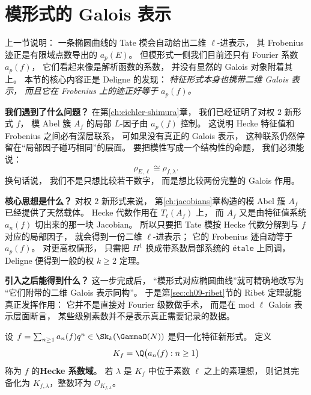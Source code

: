 \section{模形式的 Galois 表示}
\label{sec:ch09-modular-galois}

\providecommand{\Zl}{\mathbb{Z}_\ell}
\providecommand{\Ql}{\mathbb{Q}_\ell}
\providecommand{\rhobar}{\bar{\rho}}

上一节说明：
一条椭圆曲线的 Tate 模会自动给出二维 $\ell$-进表示，
其 Frobenius 迹正是有限域点数导出的 $a_p(E)$。
但模形式一侧我们目前还只有 Fourier 系数 $a_p(f)$，
它们看起来像是解析函数的系数，
并没有显然的 Galois 对象附着其上。
本节的核心内容正是 Deligne 的发现：
\emph{特征形式本身也携带二维 Galois 表示，
而且它在 Frobenius 上的迹正好等于 $a_p(f)$。}

\textbf{我们遇到了什么问题？}
在第\ref{ch:eichler-shimura}章，
我们已经证明了对权 $2$ 新形式 $f$，
模 Abel 簇 $A_f$ 的局部 $L$-因子由 $a_p(f)$ 控制。
这说明 Hecke 特征值和 Frobenius 之间必有深层联系，
可如果没有真正的 Galois 表示，
这种联系仍然停留在“局部因子碰巧相同”的层面。
要把模性写成一个结构性的命题，
我们必须能说：
\[
  \rho_{E,\ell}\cong \rho_{f,\lambda}.
\]
换句话说，
我们不是只想比较若干数字，
而是想比较两份完整的 Galois 作用。

\textbf{核心思想是什么？}
对权 $2$ 新形式来说，
第\ref{ch:jacobians}章构造的模 Abel 簇 $A_f$ 已经提供了天然载体。
Hecke 代数作用在 $T_\ell(A_f)$ 上，
而 $A_f$ 又是由特征值系统 $a_n(f)$ 切出来的那一块 Jacobian。
所以只要把 Tate 模按 Hecke 代数分解到与 $f$ 对应的局部因子，
就会得到一份二维 $\ell$-进表示；
它的 Frobenius 迹自动等于 $a_p(f)$。
对更高权情形，
只需把 $H^1$ 换成带系数局部系统的 \texttt{\'etale} 上同调，
Deligne 便得到一般的权 $k\ge 2$ 定理。

\textbf{引入之后能得到什么？}
这一步完成后，
“模形式对应椭圆曲线”就可精确地改写为
“它们附带的二维 Galois 表示同构”。
于是第\ref{sec:ch09-ribet}节的 Ribet 定理就能真正发挥作用：
它并不是直接对 Fourier 级数做手术，
而是在 mod $\ell$ Galois 表示层面断言，
某些级别素数并不是表示真正需要记录的数据。



\begin{definition}
设 $f=\sum_{n\ge 1}a_n(f)q^n\in \Sk_k(\GammaO(N))$ 是归一化特征新形式。
定义
\[
  K_f=\Q\bigl(a_n(f):n\ge 1\bigr)
\]
称为 $f$ 的\textbf{Hecke 系数域}。
若 $\lambda$ 是 $K_f$ 中位于素数 $\ell$ 之上的素理想，
则记其完备化为 $K_{f,\lambda}$，整数环为 $\mathcal O_{K_{f,\lambda}}$。
\end{definition}

